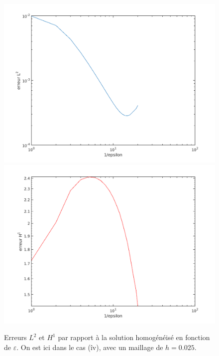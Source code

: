 \documentclass[11pt]{article}
\begin{document}
\begin{figure}
  \centering
  \includegraphics[height=.27\textheight]{SolutionPbHomogeneise/err_L2_eps}
  \includegraphics[height=.27\textheight]{SolutionPbHomogeneise/err_H1_eps} 
  \caption{Erreurs $L^2$ et $H^1$ par rapport à la solution homogénéisé en fonction de $\varepsilon$. On est ici dans le cas (îv), avec un maillage de
    $h=0.025$.}
  \label{fig:errhom}
\end{figure}
\end{document}
